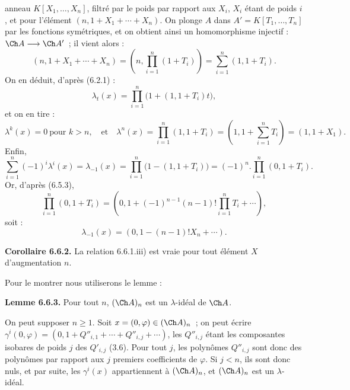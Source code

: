 anneau \(K[X_1,\ldots,X_n]\), filtré par le poids par rapport aux \(X_i\), \(X_i\) étant de poids \(i\), et pour l'élément \((n,1+X_1+\cdots+X_n)\). On plonge \(A\) dans \(A'=K[T_1,\ldots,T_n]\) par les fonctions symétriques, et on obtient ainsi un homomorphisme injectif : \(\Ch A\longrightarrow\Ch A'\)~; il vient alors :
\[
 (n,1+X_1+\cdots+X_n)
 =
 \left(n,\prod_{i=1}^n(1+T_i)\right)
 =
 \sum_{i=1}^n(1,1+T_i).
\]
On en déduit, d'après (6.2.1) :
\[
  \lambda_t(x)=\prod_{i=1}^n\bigl(1+(1,1+T_i)t\bigr),
\]
et on en tire :
\[
  \lambda^k(x)=0\ \text{pour }k>n,\quad\text{et}\quad
  \lambda^n(x)=\prod_{i=1}^n(1,1+T_i)
   =\left(1,1+\sum_{i=1}^nT_i\right)=(1,1+X_1).
\]
Enfin,
\[
  \sum_{i=1}^n(-1)^i\lambda^i(x)=\lambda_{-1}(x)
  =
  \prod_{i=1}^n\bigl(1-(1,1+T_i)\bigr)
  =
  (-1)^n.\prod_{i=1}^n(0,1+T_i).
\]
Or, d'après (6.5.3),
\[
  \prod_{i=1}^n(0,1+T_i)
  =
  \left(0,1+(-1)^{n-1}(n-1)!\prod_{i=1}^nT_i+\cdots\right),
\]
soit :
\[
  \lambda_{-1}(x)=(0,1-(n-1)!X_n+\cdots).
\]

\textbf{Corollaire 6.6.2.} La relation 6.6.1.iii) est vraie pour tout élément \(X\) d'augmentation \(n\).

Pour le montrer nous utiliserons le lemme :

\textbf{Lemme 6.6.3.} Pour tout \(n\), \((\Ch A)_n\) est un \(\lambda\)-idéal de \(\Ch A\).

On peut supposer \(n\ge1\). Soit \(x=(0,\varphi)\in(\Ch A)_n\)~; on peut écrire \(\gamma^i(0,\varphi)=(0,1+Q''_{i,1}+\cdots+Q''_{i,j}+\cdots)\), les \(Q''_{i,j}\) étant les composantes isobares de poids \(j\) des \(Q'_{i,j}\) (3.6). Pour tout \(j\), les polynômes \(Q''_{i,j}\) sont donc des polynômes par rapport aux \(j\) premiers coefficients de \(\varphi\). Si \(j<n\), ils sont donc nuls, et par suite, les \(\gamma^i(x)\) appartiennent à \((\Ch A)_n\), et \((\Ch A)_n\) est un \(\lambda\)-idéal.

